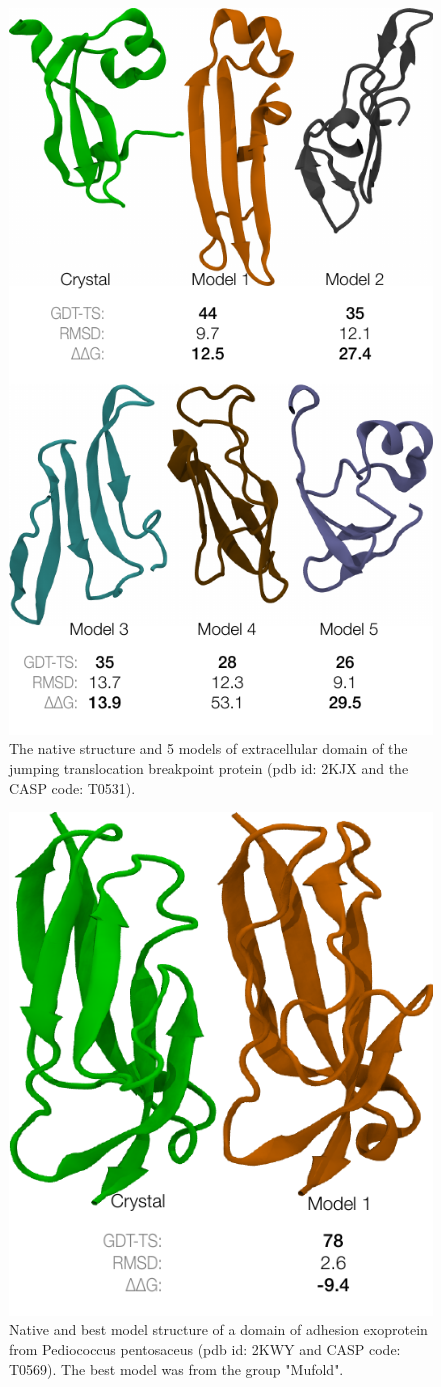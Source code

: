 \documentclass[12pt]{article}
\begin{document}
\begin{figure}
\begin{center}
\includegraphics[width=3.5 in,height=5.7 in]{T0531.pdf}
\end{center}
\caption{The native structure and 5 models of extracellular domain of the jumping translocation
breakpoint protein (pdb id: 2KJX and the CASP code: T0531).}
\label{fig:T0531}
\end{figure}

\begin{figure}
\begin{center}
\includegraphics[width=3.2 in,height=3.8 in]{T0569.pdf}
\end{center}
\caption{Native and best model structure of a domain of adhesion exoprotein from Pediococcus pentosaceus (pdb id: 2KWY and CASP code: T0569).
The best model was from the group "Mufold".}
\label{fig:T0569}
\end{figure}
\end{document}
